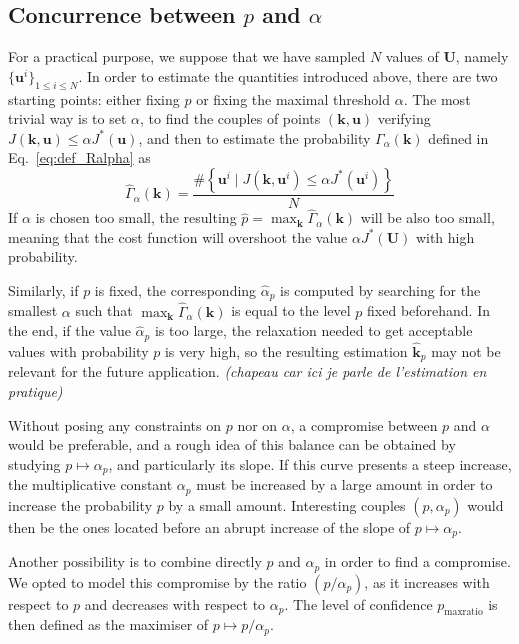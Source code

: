 \documentclass[preprint, 1p]{elsarticle}
\newcommand{\checkap}{{\alpha}_p}
\newcommand{\checka}{{\alpha}}
\newcommand{\checkk}{\mathbf{k}}
\newcommand{\victor}[1]{{\itshape\color{green} ({#1})}}
\begin{document}
\subsection{Concurrence between $p$ and $\alpha$}%
\label{ssec:balance}
For a practical purpose, we suppose that we have sampled $N$ values of $\mathbf{U}$, namely $\{\mathbf{u}^i\}_{1\leq i \leq N}$.
In order to estimate the quantities introduced above, there are two starting points: either fixing $p$ or fixing the maximal threshold $\alpha$. 
The most trivial way is to set $\alpha$, to find the couples of points $(\mathbf{k},\mathbf{u})$ verifying $J(\mathbf{k},\mathbf{u}) \leq \alpha J^*(\mathbf{u})$, and then to estimate the probability $\Gamma_{\alpha}(\mathbf{k})$ defined in Eq.~\eqref{eq:def_Ralpha} as 
\begin{equation}
\hat{\Gamma}_{\alpha}(\mathbf{k}) = \frac{\# \left\{\mathbf{u}^i \mid J(\mathbf{k},\mathbf{u}^i) \leq \alpha J^*(\mathbf{u}^i)\right\}}{N}
\end{equation}
If $\alpha$ is chosen too small, the resulting $\hat{p}=\max_{\mathbf{k}} \hat{\Gamma}_{\alpha}(\mathbf{k})$ will be also too small, meaning that the cost function will overshoot the value $\alpha J^*(\mathbf{U})$ with high probability.

Similarly, if $p$ is fixed, the corresponding $\hat{\checka}_p$ is computed by searching for the smallest $\alpha$ such that $\max_{\mathbf{k}} \hat{\Gamma}_{\alpha}(\mathbf{k})$ is equal to the level $p$ fixed beforehand. In the end, if the value $\hat{\checka}_p$ is too large, the relaxation needed to get acceptable values with probability $p$ is very high, so the resulting estimation $\hat{\checkk}_p$ may not be relevant for the future application.
\victor{chapeau car ici je parle de l'estimation en pratique}


Without posing any constraints on $p$ nor on $\alpha$, a compromise between $p$ and $\alpha$ would be preferable, and a rough idea of this balance can be obtained by studying $p \mapsto \checkap$, and particularly its slope.
If this curve presents a steep increase, the multiplicative constant $\checkap$ must be increased by a large amount in order to increase the probability $p$ by a small amount. Interesting couples $(p,\checkap)$ would then be the ones located before an abrupt increase of the slope of $p \mapsto \checkap$.

Another possibility is to combine directly $p$ and $\checkap$ in order to find a compromise. We opted to model this compromise by the ratio $(p/\checkap)$, as it increases with respect to $p$ and decreases with respect to $\checka_p$. The level of confidence $p_{\mathrm{maxratio}}$ is then defined as the maximiser of $p\mapsto p / \checka_p$.
\end{document}
